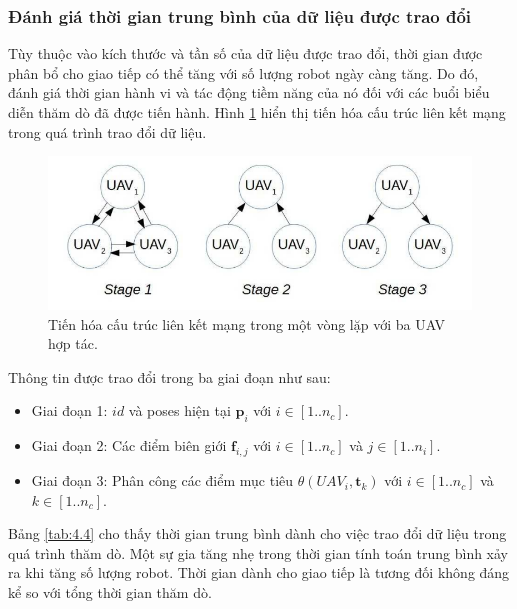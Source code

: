 \documentclass[11pt,openany]{book}
\begin{document}
\subsubsection{Đánh giá thời gian trung bình của dữ liệu được trao đổi}
Tùy thuộc vào kích thước và tần số của dữ liệu được trao đổi, thời gian được phân bổ cho giao tiếp có thể tăng với số lượng robot ngày càng tăng. Do đó, đánh giá thời gian hành vi và tác động tiềm năng của nó đối với các buổi biểu diễn thăm dò đã được tiến hành. Hình \ref{fig:4.10} hiển thị tiến hóa cấu trúc liên kết mạng trong quá trình trao đổi dữ liệu.
\begin{figure}[H]
    \centering
    \includegraphics[scale=0.4]{assets/4_10.png}
    \caption{Tiến hóa cấu trúc liên kết mạng trong một vòng lặp với ba UAV hợp tác.}
    \label{fig:4.10}
\end{figure}
Thông tin được trao đổi trong ba giai đoạn như sau:
\begin{itemize}
    \item Giai đoạn 1: $id$ và poses hiện tại $\mathbf{p}_i$ với $i \in [1..n_c].$
    \item Giai đoạn 2: Các điểm biên giới $\mathbf{f}_{i,j}$ với $i \in [1..n_c]$ và $j \in [1..n_i]$.
    \item Giai đoạn 3: Phân công các điểm mục tiêu $\theta(UAV_i,\mathbf{t}_k)$ với $i \in [1..n_c]$ và $k \in [1..n_c]$.
\end{itemize}
Bảng \ref{tab:4.4} cho thấy thời gian trung bình dành cho việc trao đổi dữ liệu trong quá trình thăm dò. Một sự gia tăng nhẹ trong thời gian tính toán trung bình xảy ra khi tăng số lượng robot. Thời gian dành cho giao tiếp là tương đối không đáng kể so với tổng thời gian thăm dò.
\end{document}
